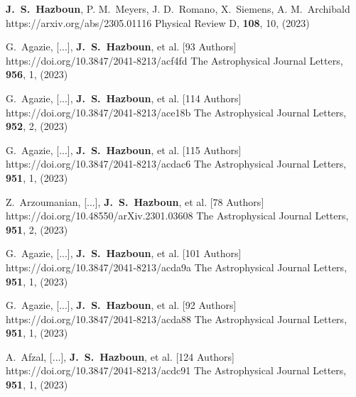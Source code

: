          {\textbf{J.~S.~Hazboun}, P. M.~{Meyers}, J. D.~{Romano}, X.~{Siemens}, A. M.~{Archibald}}
         {https://arxiv.org/abs/2305.01116}
         {{Physical Review D}, \textbf{108}, 10, (2023)}

         {G.~{Agazie}, [...], \textbf{J.~S.~{Hazboun}}, et al. [93 Authors]}
         {https://doi.org/10.3847/2041-8213/acf4fd}
         {{The Astrophysical Journal Letters}, \textbf{956}, 1, (2023)}

         {G.~{Agazie}, [...], \textbf{J.~S.~{Hazboun}}, et al. [114 Authors]}
         {https://doi.org/10.3847/2041-8213/ace18b}
         {{The Astrophysical Journal Letters}, \textbf{952}, 2, (2023)}

         {G.~{Agazie}, [...], \textbf{J.~S.~{Hazboun}}, et al. [115 Authors]}
         {https://doi.org/10.3847/2041-8213/acdac6}
         {{The Astrophysical Journal Letters}, \textbf{951}, 1, (2023)}

         {Z.~{Arzoumanian}, [...], \textbf{J.~S.~{Hazboun}}, et al. [78 Authors]}
         {https://doi.org/10.48550/arXiv.2301.03608}
         {{The Astrophysical Journal Letters}, \textbf{951}, 2, (2023)}

         {G.~{Agazie}, [...], \textbf{J.~S.~{Hazboun}}, et al. [101 Authors]}
         {https://doi.org/10.3847/2041-8213/acda9a}
         {{The Astrophysical Journal Letters}, \textbf{951}, 1, (2023)}

         {G.~{Agazie}, [...], \textbf{J.~S.~{Hazboun}}, et al. [92 Authors]}
         {https://doi.org/10.3847/2041-8213/acda88}
         {{The Astrophysical Journal Letters}, \textbf{951}, 1, (2023)}

         {A.~{Afzal}, [...], \textbf{J.~S.~{Hazboun}}, et al. [124 Authors]}
         {https://doi.org/10.3847/2041-8213/acdc91}
         {{The Astrophysical Journal Letters}, \textbf{951}, 1, (2023)}

